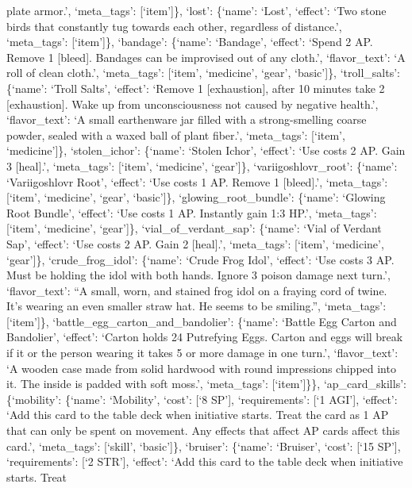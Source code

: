 \documentclass[
  letterpaper,
  DIV=11,
  numbers=noendperiod]{scrartcl}
\begin{document}
plate armor.', `meta\_tags': {[}`item'{]}\}, `lost': \{`name': `Lost',
`effect': `Two stone birds that constantly tug towards each other,
regardless of distance.', `meta\_tags': {[}`item'{]}\}, `bandage':
\{`name': `Bandage', `effect': `Spend 2 AP. Remove 1 {[}bleed{]}.
Bandages can be improvised out of any cloth.', `flavor\_text': `A roll
of clean cloth.', `meta\_tags': {[}`item', `medicine', `gear',
`basic'{]}\}, `troll\_salts': \{`name': `Troll Salts', `effect': `Remove
1 {[}exhaustion{]}, after 10 minutes take 2 {[}exhaustion{]}. Wake up
from unconsciousness not caused by negative health.', `flavor\_text': `A
small earthenware jar filled with a strong-smelling coarse powder,
sealed with a waxed ball of plant fiber.', `meta\_tags': {[}`item',
`medicine'{]}\}, `stolen\_ichor': \{`name': `Stolen Ichor', `effect':
`Use costs 2 AP. Gain 3 {[}heal{]}.', `meta\_tags': {[}`item',
`medicine', `gear'{]}\}, `variigoshlovr\_root': \{`name': `Variigoshlovr
Root', `effect': `Use costs 1 AP. Remove 1 {[}bleed{]}.', `meta\_tags':
{[}`item', `medicine', `gear', `basic'{]}\}, `glowing\_root\_bundle':
\{`name': `Glowing Root Bundle', `effect': `Use costs 1 AP. Instantly
gain 1:3 HP.', `meta\_tags': {[}`item', `medicine', `gear'{]}\},
`vial\_of\_verdant\_sap': \{`name': `Vial of Verdant Sap', `effect':
`Use costs 2 AP. Gain 2 {[}heal{]}.', `meta\_tags': {[}`item',
`medicine', `gear'{]}\}, `crude\_frog\_idol': \{`name': `Crude Frog
Idol', `effect': `Use costs 3 AP. Must be holding the idol with both
hands. Ignore 3 poison damage next turn.', `flavor\_text': ``A small,
worn, and stained frog idol on a fraying cord of twine. It's wearing an
even smaller straw hat. He seems to be smiling.'', `meta\_tags':
{[}`item'{]}\}, `battle\_egg\_carton\_and\_bandolier': \{`name': `Battle
Egg Carton and Bandolier', `effect': `Carton holds 24 Putrefying Eggs.
Carton and eggs will break if it or the person wearing it takes 5 or
more damage in one turn.', `flavor\_text': `A wooden case made from
solid hardwood with round impressions chipped into it. The inside is
padded with soft moss.', `meta\_tags': {[}`item'{]}\}\},
`ap\_card\_skills': \{`mobility': \{`name': `Mobility', `cost': {[}`8
SP'{]}, `requirements': {[}`1 AGI'{]}, `effect': `Add this card to the
table deck when initiative starts. Treat the card as 1 AP that can only
be spent on movement. Any effects that affect AP cards affect this
card.', `meta\_tags': {[}`skill', `basic'{]}\}, `bruiser': \{`name':
`Bruiser', `cost': {[}`15 SP'{]}, `requirements': {[}`2 STR'{]},
`effect': `Add this card to the table deck when initiative starts. Treat
\end{document}
